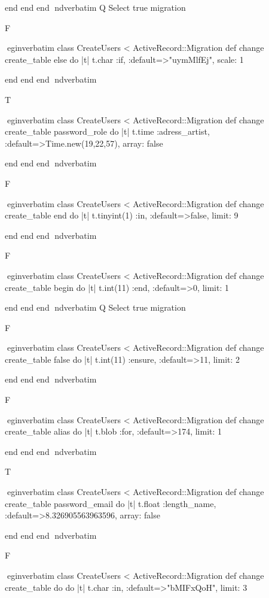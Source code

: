     end 
  end 
end
nd{verbatim}
Q
 Select true migration

F

egin{verbatim}
 class CreateUsers < ActiveRecord::Migration 
  def change 
    create_table else do |t| 
      t.char :if, :default=>"uymMlfEj", scale: 1
    
    end 
  end 
end
nd{verbatim}

T

egin{verbatim}
 class CreateUsers < ActiveRecord::Migration 
  def change 
    create_table password_role do |t| 
      t.time :adress_artist, :default=>Time.new(19,22,57), array: false
    
    end 
  end 
end
nd{verbatim}

F

egin{verbatim}
 class CreateUsers < ActiveRecord::Migration 
  def change 
    create_table end do |t| 
      t.tinyint(1) :in, :default=>false, limit: 9
    
    end 
  end 
end
nd{verbatim}

F

egin{verbatim}
 class CreateUsers < ActiveRecord::Migration 
  def change 
    create_table begin do |t| 
      t.int(11) :end, :default=>0, limit: 1
    
    end 
  end 
end
nd{verbatim}
Q
 Select true migration

F

egin{verbatim}
 class CreateUsers < ActiveRecord::Migration 
  def change 
    create_table false do |t| 
      t.int(11) :ensure, :default=>11, limit: 2
    
    end 
  end 
end
nd{verbatim}

F

egin{verbatim}
 class CreateUsers < ActiveRecord::Migration 
  def change 
    create_table alias do |t| 
      t.blob :for, :default=>174, limit: 1
    
    end 
  end 
end
nd{verbatim}

T

egin{verbatim}
 class CreateUsers < ActiveRecord::Migration 
  def change 
    create_table password_email do |t| 
      t.float :length_name, :default=>8.326905563963596, array: false
    
    end 
  end 
end
nd{verbatim}

F

egin{verbatim}
 class CreateUsers < ActiveRecord::Migration 
  def change 
    create_table do do |t| 
      t.char :in, :default=>"bMIFxQoH", limit: 3
    
